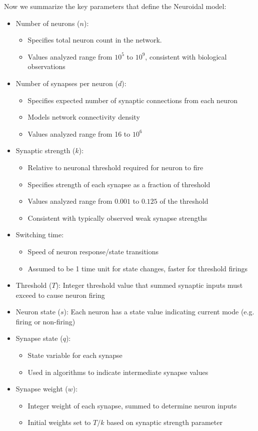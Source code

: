 Now we summarize the key parameters that define the Neuroidal model:
\begin{itemize}
\item Number of neurons ($n$): \begin{itemize} \item Specifies total neuron count in the network.
\item Values analyzed range from $10^5$ to $10^9$, consistent with biological observations
\end{itemize}
\item Number of synapses per neuron ($d$):
\begin{itemize} \item Specifies expected number of synaptic connections from each neuron
\item Models network connectivity density
\item Values analyzed range from 16 to $10^6$
\end{itemize}
\item Synaptic strength ($k$):
\begin{itemize} \item Relative to neuronal threshold required for neuron to fire
\item Specifies strength of each synapse as a fraction of threshold
\item Values analyzed range from $0.001$ to $0.125$ of the threshold
\item Consistent with typically observed weak synapse strengths
\end{itemize}
\item Switching time:
\begin{itemize} \item Speed of neuron response/state transitions
\item Assumed to be 1 time unit for state changes, faster for threshold firings
\end{itemize}
\item Threshold ($T$):
Integer threshold value that summed synaptic inputs must exceed to cause neuron firing
\item Neuron state ($s$):
Each neuron has a state value indicating current mode (e.g. firing or non-firing)
\item Synapse state ($q$):
\begin{itemize} \item State variable for each synapse
\item Used in algorithms to indicate intermediate synapse values
\end{itemize}
\item Synapse weight ($w$):
\begin{itemize} \item Integer weight of each synapse, summed to determine neuron inputs
\item Initial weights set to $T/k$ based on synaptic strength parameter
\end{itemize}
\end{itemize}


